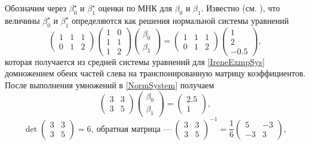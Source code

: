 \documentclass[a5paper,openany]{book}
\newcounter{IreneExmp}
\begin{document}
Обозначим через $\beta_{0}^{\star}$ и $\beta_{1}^{\star}$ оценки по МНК 
для $\beta_0$ и $\beta_1$. Известно (см. \cite{DraperSmith, Linnik}), что 
величины $\beta_{0}^{\star}$ и $\beta_{1}^{\star}$ определяются как решения 
нормальной системы уравнений 
\begin{equation}
\label{NormSystem}
\begin{pmatrix}  1 & 1 & 1 \\[2pt] 0 & 1 & 2 \end{pmatrix}
\begin{pmatrix} 1 & 0 \\[2pt] 1 & 1\\[2pt] 1 & 2 \end{pmatrix}
\begin{pmatrix}\beta_{0} \\[2pt] \beta_{1}\end{pmatrix}
=
\begin{pmatrix}  1 & 1 & 1 \\[2pt] 0 & 1 & 2 \end{pmatrix} 
\begin{pmatrix} 1\\[2pt] 2\\[2pt] -0.5\end{pmatrix}, 
\end{equation} 
которая получается из средней системы уравнений для \eqref{IreneExmpSys} домножением 
обеих частей слева на транспонированную матрицу коэффициентов. После выполнения 
умножений в \eqref{NormSystem} получаем 
\begin{equation*}
\begin{pmatrix} 3 & 3\\[2pt] 3 & 5\end{pmatrix}
\begin{pmatrix} \beta_{0} \\[2pt] \beta_{1}\end{pmatrix} 
=
\begin{pmatrix} 2.5\\[2pt] 1\end{pmatrix},
\end{equation*}
\begin{equation*}
\det\begin{pmatrix} 3 & 3\\[2pt] 3 & 5\end{pmatrix}=6, \ 
\text{обратная матрица ---} \
\begin{pmatrix} 3 & 3\\[2pt] 3 & 5 \end{pmatrix}^{-1}=
\frac{1}{6}\begin{pmatrix} 5 & -3\\[2pt] -3 & 3\end{pmatrix},
\end{equation*}
\end{document}
